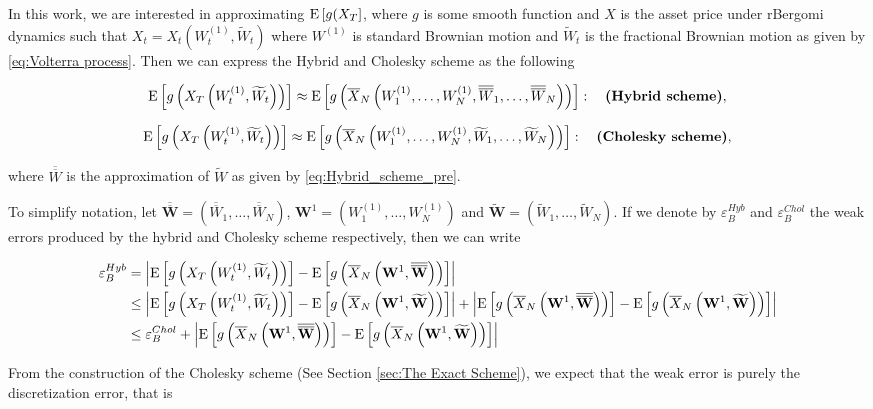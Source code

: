 In this work, we are interested in approximating $\mathrm{E}\left[g(X_T\right]$, where $g$ is some smooth function and $X$ is the asset price under rBergomi dynamics such that $X_t=X_t(W^{(1)}_t,\widetilde{W}_t)$ where $W^{(1)}$ is standard Brownian motion and  $\widetilde{W}_t$ is the fractional Brownian motion as given by \eqref{eq:Volterra process}.  Then we can express the Hybrid and Cholesky scheme as the following 

\begin{align}\label{eq: Hybrid approx}
\mathrm{E}\left[g\left(X_T\left(W^{(1)}_t,\widetilde{W}_t \right)\right)\right] \approx \mathrm{E}\left[g\left(\overline{X}_N\left(W^{(1)}_1,\dots,W^{(1)}_N, \overline{\overline{W}}_1, \dots,\overline{\overline{W}}_N\right)\right)\right]:\quad \textbf{(Hybrid  scheme)},
\end{align}

\begin{align}\label{eq: Cholesky approx}
\mathrm{E}\left[g\left(X_T\left(W^{(1)}_t,\widetilde{W}_t\right)\right)\right] \approx \mathrm{E}\left[g\left(\overline{X}_N\left(W^{(1)}_1,\dots,W^{(1)}_N, \widetilde{W}_1, \dots,\widetilde{W}_N\right)\right)\right]:\quad \textbf{(Cholesky  scheme)},
\end{align}

where $\overline{\overline{W}}$ is the approximation of $\widetilde{W}$  as given by \eqref{eq:Hybrid_scheme_pre}.

To simplify notation, let  $\overline{\overline{\mathbf{W}}}=(\overline{\overline{W}}_1,\dots,\overline{\overline{W}}_N)$, $\mathbf{W}^{1}=(W^{(1)}_1,\dots,W^{(1)}_N)$ and $\widetilde{\mathbf{W}}=(\widetilde{W}_1,\dots,\widetilde{W}_N)$. If we denote by $\varepsilon_{B}^{Hyb}$ and $\varepsilon_{B}^{Chol}$ the weak errors produced by the hybrid and Cholesky scheme respectively, then we can write
\begin{small}
\begin{align}\label{eq: Weak_error_hyb_chol}
\varepsilon_{B}^{Hyb}&=\left\lvert\mathrm{E}\left[g\left(X_T\left(W^{(1)}_t,\widetilde{W}_t\right) \right)\right]-\mathrm{E}\left[g\left(\overline{X}_N\left(\mathbf{W}^{1}, \overline{\overline{\mathbf{W}}}\right) \right)\right]\right\rvert \nonumber\\
&\le \left\lvert\mathrm{E}\left[g\left(X_T\left(W^{(1)}_t,\widetilde{W}_t\right)\right)\right]-\mathrm{E}\left[g\left(\overline{X}_N\left(\mathbf{W}^{1}, \widetilde{\mathbf{W}}\right)\right)\right]\right\rvert+ \left\lvert \mathrm{E}\left[g\left(\overline{X}_N\left(\mathbf{W}^{1}, \overline{\overline{\mathbf{W}}}\right)\right)\right]- \mathrm{E}\left[g\left(\overline{X}_N\left(\mathbf{W}^{1}, \widetilde{\mathbf{W}}\right)\right)\right]\right\rvert\nonumber\\
&\le \varepsilon_{B}^{Chol}+ \left\lvert \mathrm{E}\left[g\left(\overline{X}_N\left(\mathbf{W}^{1}, \overline{\overline{\mathbf{W}}}\right)\right)\right]- \mathrm{E}\left[g\left(\overline{X}_N\left(\mathbf{W}^{1}, \widetilde{\mathbf{W}}\right)\right)\right]\right\rvert
\end{align}
\end{small}
From the construction of the Cholesky scheme (See Section \ref{sec:The Exact Scheme}), we expect that the weak error is purely the discretization error, that is

